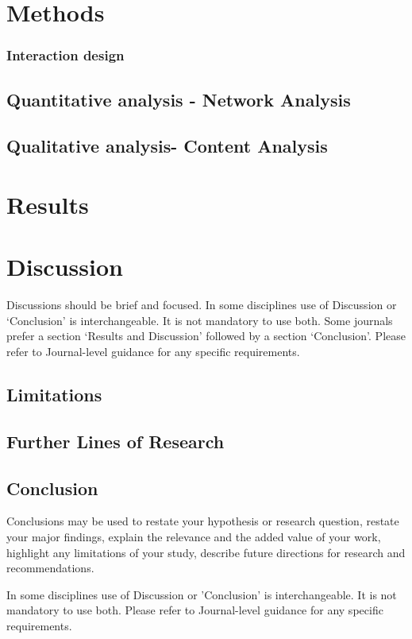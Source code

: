 \documentclass[sn-mathphys, Numbered]{sn-jnl}%
\theoremstyle{thmstyleone}%
\theoremstyle{thmstyletwo}%
\theoremstyle{thmstylethree}%
\begin{document}
\section{Methods}\label{Methods}

\subsubsection{Interaction design}\label{Interaction design}



\subsection{Quantitative analysis - Network Analysis}\label{Quantitative Analysis}

\subsection{Qualitative analysis- Content Analysis}\label{Qualitative Analysis}



\section{Results}\label{Results}

\section{Discussion}\label{Discussion}

Discussions should be brief and focused. In some disciplines use of Discussion or `Conclusion' is interchangeable. It is not mandatory to use both. Some journals prefer a section `Results and Discussion' followed by a section `Conclusion'. Please refer to Journal-level guidance for any specific requirements. 


\subsection{Limitations}\label{Limitations}
\subsection{Further Lines of Research}\label{Further Lines of Research}

\subsection{Conclusion}\label{Conclusion}

Conclusions may be used to restate your hypothesis or research question, restate your major findings, explain the relevance and the added value of your work, highlight any limitations of your study, describe future directions for research and recommendations. 

In some disciplines use of Discussion or 'Conclusion' is interchangeable. It is not mandatory to use both. Please refer to Journal-level guidance for any specific requirements. 


\printbibliography
\end{document}
